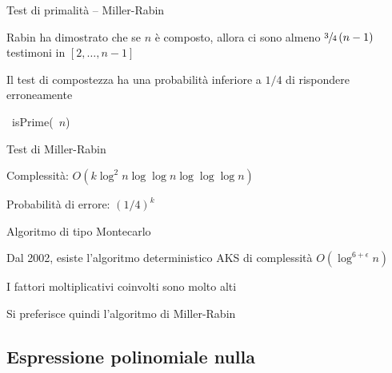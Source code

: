 \begin{frame}{Test di primalità -- Miller-Rabin}

\vspace{-9pt}
\BIL
\item Rabin ha dimostrato che se $n$ è composto, allora ci sono
almeno $\sfrac{3}{4}\,(n-1)$ testimoni in $[2, \ldots, n-1]$ 
\item Il test di compostezza ha una probabilità inferiore a $1/4$ di rispondere
erroneamente
\EIL

\begin{Procedure}
\caption[A]{\BOOLEAN\ \textsf{isPrime}(\INTEGER\ $n$)}
\Return \TRUE\;
\end{Procedure}

\end{frame}

\begin{frame}{Test di Miller-Rabin}

\vspace{-9pt}
\begin{myboxtitle}[Riassunto]
\BIL
\item Complessità: $O(k \log^2 n \log \log n \log \log \log n)$
\item Probabilità di errore: $(1/4)^k$
\item Algoritmo di tipo Montecarlo
\EIL
\end{myboxtitle}

\begin{myboxtitle}
\BIL
\item Dal 2002, esiste l'algoritmo deterministico AKS di complessità $O(\log^{6+\epsilon} n)$
\item I fattori moltiplicativi coinvolti sono molto alti
\item Si preferisce quindi l'algoritmo di Miller-Rabin
\EIL
\end{myboxtitle}

\end{frame}

\subsection{Espressione polinomiale nulla}

